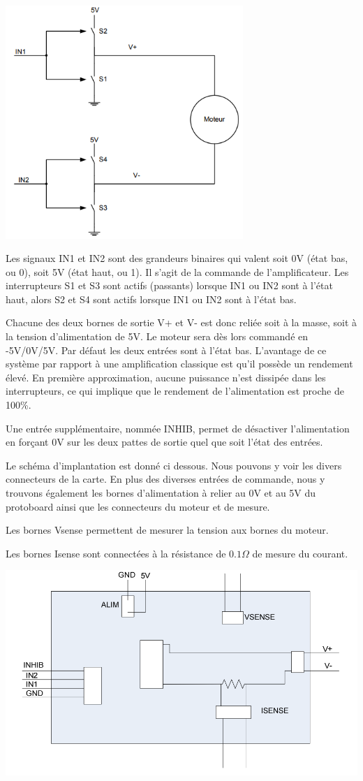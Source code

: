 \documentclass{../template/labo}
\begin{document}
\begin{center}
\includegraphics[width=9cm]{sch10}
\end{center}

Les signaux IN1 et IN2 sont des grandeurs binaires qui valent soit 0V (état bas, ou 0), soit 5V (état haut, ou 1). Il
s'agit de la commande de l'amplificateur.
Les interrupteurs S1 et S3 sont actifs (passants) lorsque IN1 ou IN2 sont à l'état haut, alors S2 et S4 sont actifs
lorsque IN1 ou IN2 sont à l'état bas.


Chacune des deux bornes de sortie V+ et V- est donc reliée soit à la masse, soit à la tension d'alimentation de
5V. Le moteur sera dès lors commandé en -5V/0V/5V. Par défaut les deux entrées sont à l'état bas.
L'avantage de ce système par rapport à une amplification classique est qu'il possède un rendement élevé. En
première approximation, aucune puissance n'est dissipée dans les interrupteurs, ce qui implique que le
rendement de l'alimentation est proche de 100\%.


Une entrée supplémentaire, nommée INHIB, permet de désactiver l'alimentation en forçant 0V sur les deux
pattes de sortie quel que soit l'état des entrées.


Le schéma d'implantation est donné ci dessous. Nous pouvons y voir les divers connecteurs de la carte. En plus
des diverses entrées de commande, nous y trouvons également les bornes d'alimentation à relier au 0V et au 5V
du protoboard ainsi que les connecteurs du moteur et de mesure.


Les bornes Vsense permettent de mesurer la tension aux bornes du moteur.


Les bornes Isense sont connectées à la résistance de $0.1\Omega$ de mesure du courant.

\begin{center}
\includegraphics[width=15cm]{sch11}
\end{center}
\end{document}
